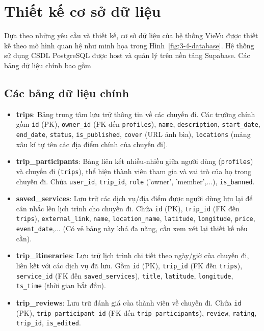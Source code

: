 \section{Thiết kế cơ sở dữ liệu}


Dựa theo những yêu cầu và thiết kế, cơ sở dữ liệu của hệ thống VieVu được thiết kế theo mô hình quan hệ như minh họa trong Hình~\ref{fig:3-4-database}. %
Hệ thống sử dụng CSDL PostgreSQL được host và quản lý trên nền tảng Supabase. Các bảng dữ liệu chính bao gồm
\subsection{Các bảng dữ liệu chính}
\begin{itemize}
    \item \textbf{trips}: Bảng trung tâm lưu trữ thông tin về các chuyến đi. Các trường chính gồm \texttt{id} (PK), \texttt{owner\_id} (FK đến \texttt{profiles}), \texttt{name}, \texttt{description}, \texttt{start\_date}, \texttt{end\_date}, \texttt{status}, \texttt{is\_published}, \texttt{cover} (URL ảnh bìa), \texttt{locations} (mảng xâu kí tự tên các địa điểm chính của chuyến đi).

    \item \textbf{trip\_participants}: Bảng liên kết nhiều-nhiều giữa người dùng (\texttt{profiles}) và chuyến đi (\texttt{trips}), thể hiện thành viên tham gia và vai trò của họ trong chuyến đi. Chứa \texttt{user\_id}, \texttt{trip\_id}, \texttt{role} ('owner', 'member',...), \texttt{is\_banned}.

    \item \textbf{saved\_services}: Lưu trữ các dịch vụ/địa điểm được người dùng lưu lại để cân nhắc lên lịch trình cho chuyến đi. Chứa \texttt{id} (PK), \texttt{trip\_id} (FK đến \texttt{trips}), \texttt{external\_link}, \texttt{name}, \texttt{location\_name}, \texttt{latitude}, \texttt{longitude}, \texttt{price}, \texttt{event\_date},... (Có vẻ bảng này khá đa năng, cần xem xét lại thiết kế nếu cần).

    \item \textbf{trip\_itineraries}: Lưu trữ lịch trình chi tiết theo ngày/giờ của chuyến đi, liên kết với các dịch vụ đã lưu. Gồm \texttt{id} (PK), \texttt{trip\_id} (FK đến \texttt{trips}), \texttt{service\_id} (FK đến \texttt{saved\_services}), \texttt{title}, \texttt{latitude}, \texttt{longitude}, \texttt{ts\_time} (thời gian bắt đầu).

    \item \textbf{trip\_reviews}: Lưu trữ đánh giá của thành viên về chuyến đi. Chứa \texttt{id} (PK), \texttt{trip\_participant\_id} (FK đến \texttt{trip\_participants}), \texttt{review}, \texttt{rating}, \texttt{trip\_id}, \texttt{is\_edited}.
    

\end{itemize}
